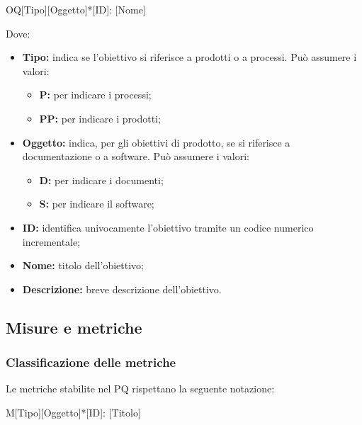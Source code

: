 \documentclass[../NormediProgetto.tex]{subfiles}
\begin{document}
    \begin{center}
        OQ[Tipo][Oggetto]*[ID]: [Nome]
    \end{center}
    
Dove:

\begin{itemize}
    \item \textbf{Tipo:} indica se l'obiettivo si riferisce a prodotti o a processi. Può assumere i valori:
    
    \begin{itemize}
        \item \textbf{P:} per indicare i processi;
        \item \textbf{PP:} per indicare i prodotti;
    \end{itemize}
    
    \item \textbf{Oggetto:} indica, per gli obiettivi di prodotto, se si riferisce a documentazione o a software. Può assumere i valori:
    
    \begin{itemize}
        \item \textbf{D:} per indicare i documenti;
        \item \textbf{S:} per indicare il software;
    \end{itemize}
    
    \item \textbf{ID:} identifica univocamente l'obiettivo tramite un codice numerico incrementale;
    
    \item \textbf{Nome:} titolo dell'obiettivo;
    
    \item \textbf{Descrizione:} breve descrizione dell'obiettivo.
\end{itemize}

\subsection{Misure e metriche}

\subsubsection*{Classificazione delle metriche}

Le metriche stabilite nel PQ rispettano la seguente notazione:

    \begin{center}
        M[Tipo][Oggetto]*[ID]: [Titolo]
    \end{center}
    
\end{document}
